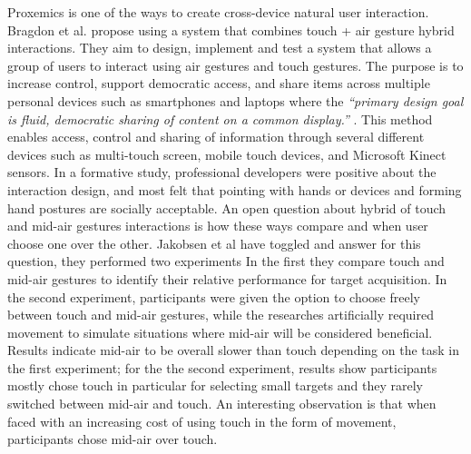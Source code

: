 Proxemics is one of the ways to create cross-device natural user interaction.
Bragdon et al. propose using a system that combines touch + air gesture hybrid interactions.
They aim to design, implement and test a system that allows a group of users to interact using air gestures and touch gestures. 
The purpose is to increase control, support democratic access, and share items across multiple personal devices such as smartphones and laptops where the {\em``primary design goal is fluid, democratic sharing of content on a common display.''} \cite{Bragton:2011}. This method enables access, control and sharing of information through several different devices such as multi-touch screen, mobile touch devices, and Microsoft Kinect sensors. In a formative study, professional developers were positive about the interaction design, and most felt that pointing with hands or devices and forming hand postures are socially acceptable. 
An open question about hybrid of touch and mid-air gestures interactions is how these ways compare and when user choose one over the other. Jakobsen et al \cite{Jakobsen:2015} have toggled and answer for this question, they performed two experiments In the first they compare touch and mid-air gestures to identify their relative performance for target acquisition. In the second experiment, participants were given the option to choose freely between touch and mid-air gestures, while the researches artificially required movement to simulate situations where mid-air will be considered beneficial. Results indicate mid-air to be overall slower than touch depending on the task in the first experiment; for the the second experiment, results show participants mostly chose touch in particular for selecting small targets and they rarely switched between mid-air and touch. An interesting observation is that when faced with an increasing cost of using touch in the form of movement, participants chose mid-air over touch.